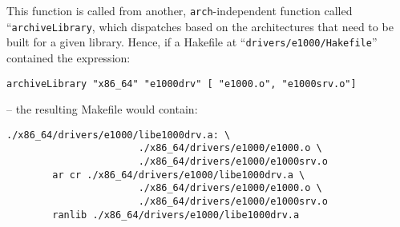 \documentclass[a4paper,twoside]{report} %
\begin{document}
This function is called from another, \texttt{arch}-independent
function called ``\texttt{archiveLibrary}, which dispatches based on
the architectures that need to be built for a given library. 
Hence, if a Hakefile at ``\texttt{drivers/e1000/Hakefile}'' contained
the expression:
\begin{verbatim}
archiveLibrary "x86_64" "e1000drv" [ "e1000.o", "e1000srv.o"]
\end{verbatim}
-- the resulting Makefile would contain:
\begin{verbatim}
./x86_64/drivers/e1000/libe1000drv.a: \
                       ./x86_64/drivers/e1000/e1000.o \
                       ./x86_64/drivers/e1000/e1000srv.o 
        ar cr ./x86_64/drivers/e1000/libe1000drv.a \
                       ./x86_64/drivers/e1000/e1000.o \
                       ./x86_64/drivers/e1000/e1000srv.o 
        ranlib ./x86_64/drivers/e1000/libe1000drv.a
\end{verbatim}
\end{document}
